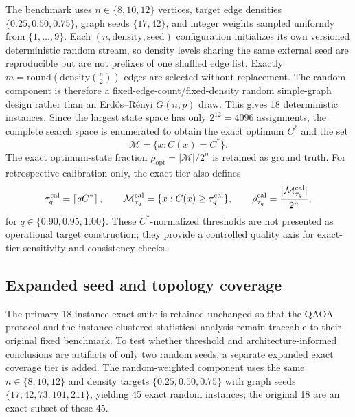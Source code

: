 \documentclass[5p,times]{elsarticle}
\begin{document}
The benchmark uses $n\in\{8,10,12\}$ vertices, target edge densities $\{0.25,0.50,0.75\}$, graph seeds $\{17,42\}$, and integer weights sampled uniformly from $\{1,\ldots,9\}$. Each $(n,\mathrm{density},\mathrm{seed})$ configuration initializes its own versioned deterministic random stream, so density levels sharing the same external seed are reproducible but are not prefixes of one shuffled edge list. Exactly $m=\mathrm{round}(\mathrm{density}\binom{n}{2})$ edges are selected without replacement. The random component is therefore a fixed-edge-count/fixed-density random simple-graph design rather than an Erd\H{o}s--R\'enyi $G(n,p)$ draw. This gives 18 deterministic instances. Since the largest state space has only $2^{12}=4096$ assignments, the complete search space is enumerated to obtain the exact optimum $C^*$ and the set
\begin{equation}
\mathcal{M}=\{x:C(x)=C^*\}.
\end{equation}
The exact optimum-state fraction $\rho_{\mathrm{opt}}=|\mathcal{M}|/2^n$ is retained as ground truth. For retrospective calibration only, the exact tier also defines
\begin{equation}
\tau_q^{\rm cal}=\left\lceil q C^*\right\rceil,
\qquad
\mathcal{M}_{\tau_q}^{\rm cal}=\{x:C(x)\geq\tau_q^{\rm cal}\},
\qquad
\rho_{\tau_q}^{\rm cal}=\frac{|\mathcal{M}_{\tau_q}^{\rm cal}|}{2^n},
\end{equation}
for $q\in\{0.90,0.95,1.00\}$. These $C^*$-normalized thresholds are not presented as operational target construction; they provide a controlled quality axis for exact-tier sensitivity and consistency checks.

\begin{table}[t]
\centering
\caption{Structure of the exact benchmark suite. Each $n$ contains three density targets and two graph seeds.}
\label{tab:suite}

\end{table}

\subsection{Expanded seed and topology coverage}
The primary 18-instance exact suite is retained unchanged so that the QAOA protocol and the instance-clustered statistical analysis remain traceable to their original fixed benchmark. To test whether threshold and architecture-informed conclusions are artifacts of only two random seeds, a separate expanded exact coverage tier is added. The random-weighted component uses the same $n\in\{8,10,12\}$ and density targets $\{0.25,0.50,0.75\}$ with graph seeds $\{17,42,73,101,211\}$, yielding 45 exact random instances; the original 18 are an exact subset of these 45.
\end{document}
